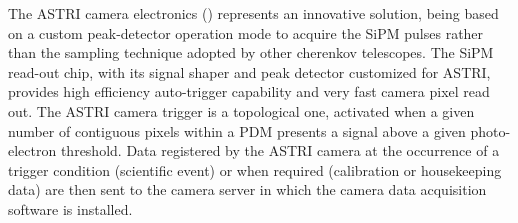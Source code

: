 The ASTRI camera electronics (\cite{Sottile2016}) represents an innovative solution, being based on a custom peak-detector operation mode to acquire the SiPM pulses rather than the sampling technique adopted by other cherenkov telescopes. The SiPM  read-out chip, with its signal shaper and peak detector customized for ASTRI, provides high efficiency auto-trigger capability and very fast camera pixel read out. The ASTRI camera trigger is a topological one, activated when a given number of contiguous pixels within a PDM presents a signal above a given photo-electron threshold. Data registered by the ASTRI camera at the occurrence of a trigger condition (scientific event) or when required (calibration or housekeeping data) are then sent to the camera server in which the camera data acquisition software is installed. 